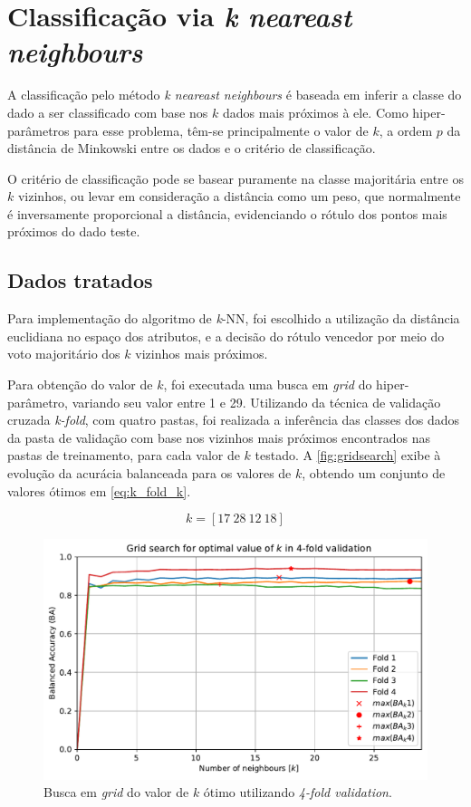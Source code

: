 \clearpage
\section{Classificação via \textit{k neareast neighbours}}

A classificação pelo método \textit{k neareast neighbours} é baseada em inferir a classe do dado a ser classificado com base nos $k$ dados mais próximos à ele. Como hiper-parâmetros para esse problema, têm-se principalmente o valor de $k$, a ordem $p$ da distância de Minkowski entre os dados e o critério de classificação.

O critério de classificação pode se basear puramente na classe majoritária entre os $k$ vizinhos, ou levar em consideração a distância como um peso, que normalmente é inversamente proporcional a distância, evidenciando o rótulo dos pontos mais próximos do dado teste.


\subsection{Dados tratados}

Para implementação do algoritmo de \textit{k}-NN, foi escolhido a utilização da distância euclidiana no espaço dos atributos, e a decisão do rótulo vencedor por meio do voto majoritário dos $k$ vizinhos mais próximos.

Para obtenção do valor de $k$, foi executada uma busca em \textit{grid} do hiper-parâmetro, variando seu valor entre 1 e 29. Utilizando da técnica de validação cruzada \textit{k-fold}, com quatro pastas, foi realizada a inferência das classes dos dados da pasta de validação com base nos vizinhos mais próximos encontrados nas pastas de treinamento, para cada valor de $k$ testado. A \autoref{fig:gridsearch} exibe à evolução da acurácia balanceada para os valores de $k$, obtendo um conjunto de valores ótimos em \eqref{eq:k_fold_k}.

\begin{equation}\label{eq:k_fold_k}
	k = [17\ 28\ 12\ 18]
\end{equation}


\begin{figure}[H]
	\centering
	\includegraphics[width=0.75\linewidth]{../../plot/knn_1/grid_search_k_fold}
	\caption{Busca em \textit{grid} do valor de $k$ ótimo utilizando \textit{4-fold validation}.}
	\label{fig:gridsearch}
\end{figure}

